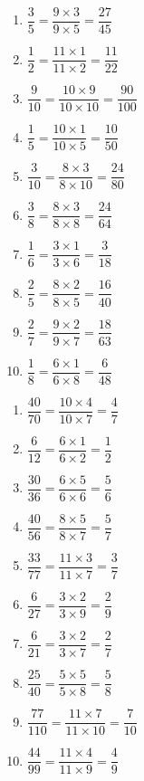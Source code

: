 \documentclass[a4paper,11pt,fleqn]{article}
\begin{document}
\begin{correction}
\exo{}

\begin{multicols}{2}
\begin{enumerate}[itemsep=2em]
	\item $ \dfrac{3}{5} = \dfrac{9 \times 3}{9 \times 5} = \dfrac{27}{45} $
	\item $ \dfrac{1}{2} = \dfrac{11 \times 1}{11 \times 2} = \dfrac{11}{22} $
	\item $ \dfrac{9}{10} = \dfrac{10 \times 9}{10 \times 10} = \dfrac{90}{100} $
	\item $ \dfrac{1}{5} = \dfrac{10 \times 1}{10 \times 5} = \dfrac{10}{50} $
	\item $ \dfrac{3}{10} = \dfrac{8 \times 3}{8 \times 10} = \dfrac{24}{80} $
	\item $ \dfrac{3}{8} = \dfrac{8 \times 3}{8 \times 8} = \dfrac{24}{64} $
	\item $ \dfrac{1}{6} = \dfrac{3 \times 1}{3 \times 6} = \dfrac{3}{18} $
	\item $ \dfrac{2}{5} = \dfrac{8 \times 2}{8 \times 5} = \dfrac{16}{40} $
	\item $ \dfrac{2}{7} = \dfrac{9 \times 2}{9 \times 7} = \dfrac{18}{63} $
	\item $ \dfrac{1}{8} = \dfrac{6 \times 1}{6 \times 8} = \dfrac{6}{48} $
\end{enumerate}
\end{multicols}

\exo{}

\begin{multicols}{2}
\begin{enumerate}[itemsep=2em]
	\item $ \dfrac{40}{70} = \dfrac{10 \times 4}{10 \times 7} = \dfrac{4}{7} $
	\item $ \dfrac{6}{12} = \dfrac{6 \times 1}{6 \times 2} = \dfrac{1}{2} $
	\item $ \dfrac{30}{36} = \dfrac{6 \times 5}{6 \times 6} = \dfrac{5}{6} $
	\item $ \dfrac{40}{56} = \dfrac{8 \times 5}{8 \times 7} = \dfrac{5}{7} $
	\item $ \dfrac{33}{77} = \dfrac{11 \times 3}{11 \times 7} = \dfrac{3}{7} $
	\item $ \dfrac{6}{27} = \dfrac{3 \times 2}{3 \times 9} = \dfrac{2}{9} $
	\item $ \dfrac{6}{21} = \dfrac{3 \times 2}{3 \times 7} = \dfrac{2}{7} $
	\item $ \dfrac{25}{40} = \dfrac{5 \times 5}{5 \times 8} = \dfrac{5}{8} $
	\item $ \dfrac{77}{110} = \dfrac{11 \times 7}{11 \times 10} = \dfrac{7}{10} $
	\item $ \dfrac{44}{99} = \dfrac{11 \times 4}{11 \times 9} = \dfrac{4}{9} $
\end{enumerate}
\end{multicols}


\end{correction}
\end{document}
